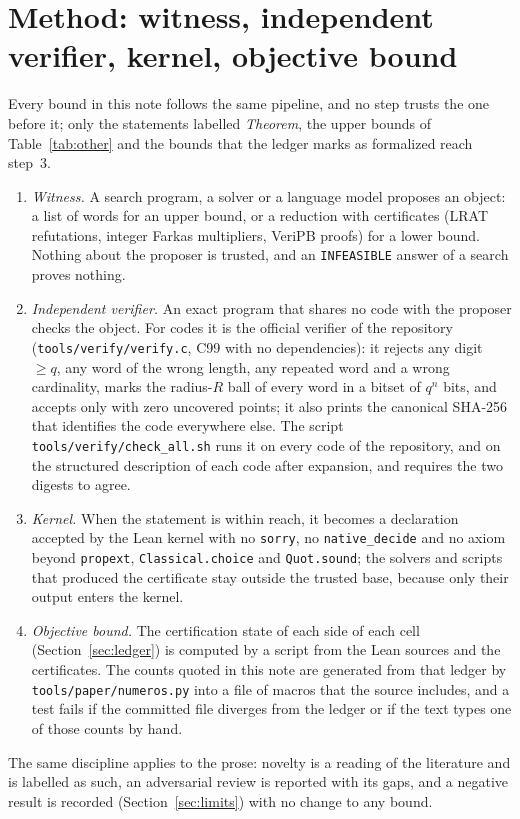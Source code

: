 \documentclass[11pt]{amsart}
\theoremstyle{definition}
\theoremstyle{remark}
\begin{document}
\section{Method: witness, independent verifier, kernel, objective bound}\label{sec:method}
Every bound in this note follows the same pipeline, and no step trusts the one before it; only the statements labelled \emph{Theorem}, the upper bounds of Table~\ref{tab:other} and the bounds that the ledger marks as formalized reach step~3.
\begin{enumerate}
\item \emph{Witness.} A search program, a solver or a language model proposes an object: a list of words for an upper bound, or a reduction with certificates (LRAT refutations, integer Farkas multipliers, VeriPB proofs) for a lower bound. Nothing about the proposer is trusted, and an \texttt{INFEASIBLE} answer of a search proves nothing.
\item \emph{Independent verifier.} An exact program that shares no code with the proposer checks the object. For codes it is the official verifier of the repository (\texttt{tools/\allowbreak verify/\allowbreak verify.c}, C99 with no dependencies): it rejects any digit $\ge q$, any word of the wrong length, any repeated word and a wrong cardinality, marks the radius-$R$ ball of every word in a bitset of $q^n$ bits, and accepts only with zero uncovered points; it also prints the canonical SHA-256 that identifies the code everywhere else. The script \texttt{tools/\allowbreak verify/\allowbreak check\_\allowbreak all.sh} runs it on every code of the repository, and on the structured description of each code after expansion, and requires the two digests to agree.
\item \emph{Kernel.} When the statement is within reach, it becomes a declaration accepted by the Lean kernel with no \texttt{sorry}, no \texttt{native\_decide} and no axiom beyond \texttt{propext}, \texttt{Classical.choice} and \texttt{Quot.sound}; the solvers and scripts that produced the certificate stay outside the trusted base, because only their output enters the kernel.
\item \emph{Objective bound.} The certification state of each side of each cell (Section~\ref{sec:ledger}) is computed by a script from the Lean sources and the certificates. The counts quoted in this note are generated from that ledger by \texttt{tools/\allowbreak paper/\allowbreak numeros.py} into a file of macros that the source includes, and a test fails if the committed file diverges from the ledger or if the text types one of those counts by hand.
\end{enumerate}
The same discipline applies to the prose: novelty is a reading of the literature and is labelled as such, an adversarial review is reported with its gaps, and a negative result is recorded (Section~\ref{sec:limits}) with no change to any bound.
\end{document}
